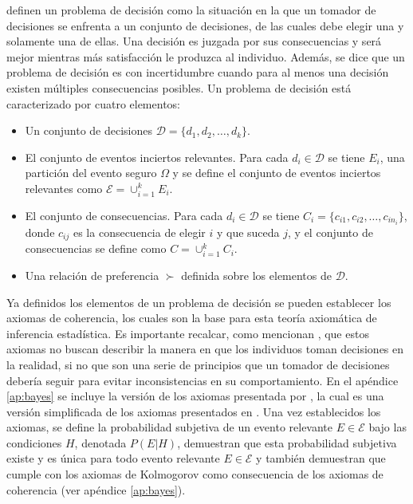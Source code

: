 \documentclass[11pt,a4paper]{article}
\begin{document}
\citet{mendoza} definen un problema de decisión como la situación en la que un tomador de decisiones se enfrenta a un conjunto de decisiones, 	de las cuales debe elegir una y solamente una de ellas. Una decisión es juzgada por sus consecuencias y será mejor mientras más satisfacción le produzca al individuo. Además, se dice que un problema de decisión es con incertidumbre cuando para al menos una decisión existen múltiples consecuencias posibles. Un problema de decisión está caracterizado por cuatro elementos:
\begin{itemize}
\item Un conjunto de decisiones $\mathcal{D} = \lbrace d_1, d_2, \dots, d_k\rbrace$.
\item El conjunto de eventos inciertos relevantes. Para cada $d_i \in \mathcal{D}$ se tiene $E_i$, una partición del evento seguro $\Omega$ y se define el conjunto de eventos inciertos relevantes como $\mathcal{E} = \cup_{i=1}^k E_i$.
\item El conjunto de consecuencias. Para cada $d_i \in \mathcal{D}$ se tiene $C_i = \lbrace c_{i1}, c_{i2}, \dots, c_{in_i}\rbrace$, donde $c_{ij}$ es la consecuencia de elegir $i$ y que suceda $j$, y el conjunto de consecuencias se define como $C = \cup_{i=1}^k C_i$.
\item Una relación de preferencia $\succ$ definida sobre los elementos de $\mathcal{D}$.
\end{itemize}

Ya definidos los elementos de un problema de decisión se pueden establecer los axiomas de coherencia, los cuales son la base para esta teoría axiomática de inferencia estadística. Es importante recalcar, como mencionan \citet{bernardo}, que estos axiomas no buscan describir la manera en que los individuos toman decisiones en la realidad, si no que son una serie de principios que un tomador de decisiones debería seguir para evitar inconsistencias en su comportamiento. En el apéndice \ref{ap:bayes} se incluye la versión de los axiomas presentada por \citet{mendoza}, la cual es una versión simplificada de los axiomas presentados en \citet{bernardo}. Una vez establecidos los axiomas, se define la probabilidad subjetiva de un evento relevante $E \in \mathcal{E}$ bajo las condiciones $H$, denotada $P(E|H)$, demuestran que esta probabilidad subjetiva existe y es única para todo evento relevante $E \in \mathcal{E}$ y también demuestran que cumple con los axiomas de Kolmogorov como consecuencia de los axiomas de coherencia (ver apéndice \ref{ap:bayes}).
\end{document}
